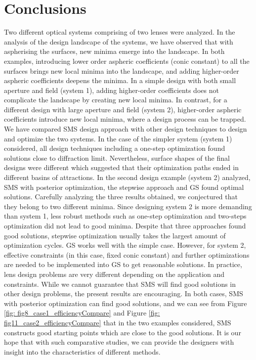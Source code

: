 \section{Conclusions}
Two different optical systems comprising of two lenses were analyzed. In the analysis of the design landscape of the systems, we have observed that with aspherising the surfaces, new minima emerge into the landscape. In both examples, introducing lower order aspheric coefficients (conic constant) to all the surfaces brings new local minima into the landscape, and adding higher-order aspheric coefficients deepens the minima. In a simple design with both small aperture and field (system 1), adding higher-order coefficients does not complicate the landscape by creating new local minima. In contrast, for a different design with large aperture and field (system 2), higher-order aspheric coefficients introduce new local minima, where a design process can be trapped.
We have compared SMS design approach with other design techniques to design and optimize the two systems. In the case of the simpler system (system 1) considered, all design techniques including a one-step optimization found solutions close to diffraction limit. Nevertheless, surface shapes of the final designs were different which suggested that their optimization paths ended in different basins of attractions. 
In the second design example (system 2) analyzed, SMS with posterior optimization, the stepwise approach and GS found optimal solutions. Carefully analyzing the three results obtained, we conjectured that they belong to two different minima. Since designing system 2 is more demanding than system 1, less robust methods such as one-step optimization and two-steps optimization did not lead to good minima. Despite that three approaches found good solutions, stepwise optimization usually takes the largest amount of optimization cycles. GS works well with the simple case. However, for system 2, effective constraints (in this case, fixed conic constant) and further optimizations are needed to be implemented into GS to get reasonable solutions. In practice, lens design problems are very different depending on the application and constraints. While we cannot guarantee that SMS will find good solutions in other design problems, the present results are encouraging. In both cases, SMS with posterior optimization can find good solutions, and we can see from Figure \ref{fig: fig8_case1_efficiencyCompare} and Figure \ref{fig: fig11_case2_efficiencyCompare} that in the two examples considered, SMS constructs good starting points which are close to the good solutions. It is our hope that with such comparative studies, we can provide the designers with insight into the characteristics of different methods.



